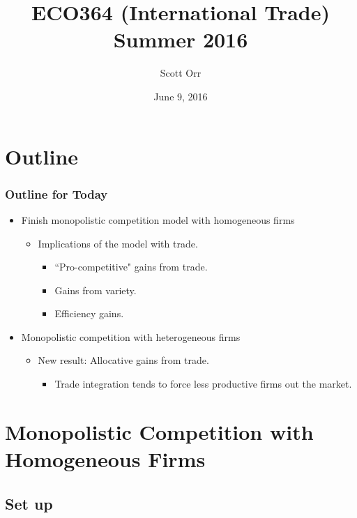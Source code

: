 \documentclass{beamer}
\title{ECO364 (International Trade) Summer 2016}
\date{June 9, 2016}
\author[Scott Orr]{Scott Orr}
\institute{University of Toronto}
\begin{document}
	
	\begin{frame}
		\titlepage
	\end{frame}
	
\section{Outline}

\begin{frame}
\frametitle{Outline for Today}
\begin{itemize}
	\item Finish monopolistic competition model with homogeneous firms
		\begin{itemize}
			\item Implications of the model with trade.
				\begin{itemize}
					\item ``Pro-competitive" gains from trade.
					\item Gains from variety.
					\item Efficiency gains. 
				\end{itemize}
		\end{itemize}
	\item Monopolistic competition with heterogeneous firms
		\begin{itemize}
			\item New result: Allocative gains from trade.	
				\begin{itemize}
					\item Trade integration tends to force less productive firms out the market. 
				\end{itemize}
		\end{itemize}
\end{itemize}
\end{frame}



\section{Monopolistic Competition with Homogeneous Firms}
\subsection{Set up}
\end{document}
